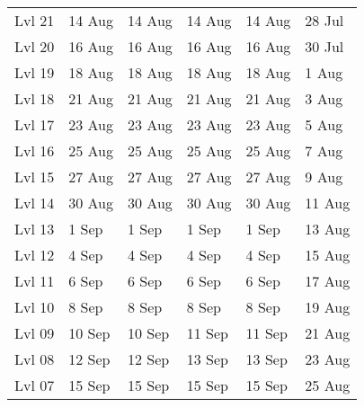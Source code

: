 \begin{table}[htbp]
\begin{tabular}{llllll}
Lvl 21  & 14 Aug   &14 Aug  & 14 Aug        &14 Aug         &28 Jul\\
Lvl 20  & 16 Aug   &16 Aug          &16 Aug         &16 Aug         &30 Jul\\
Lvl 19  & 18 Aug   &18 Aug           &18 Aug         &18 Aug         &1 Aug\\
Lvl 18  & 21 Aug   &21 Aug & 21 Aug                  &21 Aug         &3 Aug\\
Lvl 17  & 23 Aug   &23 Aug  &23 Aug         &23 Aug         &5 Aug\\
Lvl 16  & 25 Aug   &25 Aug  &25 Aug         &25 Aug         &7 Aug\\
Lvl 15  & 27 Aug   &27 Aug  &27 Aug         &27 Aug         &9 Aug\\
Lvl 14  & 30 Aug   &30 Aug  &30 Aug         &30 Aug         &11 Aug\\
Lvl 13  & 1 Sep     &1 Sep    &1 Sep         &1 Sep         &13 Aug\\
Lvl 12  & 4 Sep     &4 Sep    & 4 Sep        &4 Sep         &15 Aug\\
Lvl 11  & 6 Sep     &6 Sep    & 6 Sep        &6 Sep         &17 Aug\\
Lvl 10  & 8 Sep     &8 Sep    & 8 Sep        &8 Sep         &19 Aug\\
Lvl 09  & 10 Sep   &10 Sep   & 11 Sep        &11 Sep         &21 Aug\\
Lvl 08  & 12 Sep   &12 Sep   & 13 Sep        &13 Sep         &23 Aug\\
Lvl 07  & 15 Sep   &15 Sep   & 15 Sep        &15 Sep         &25 Aug\\
\bottomrule
\end{tabular}
\normalsize
\end{table}


